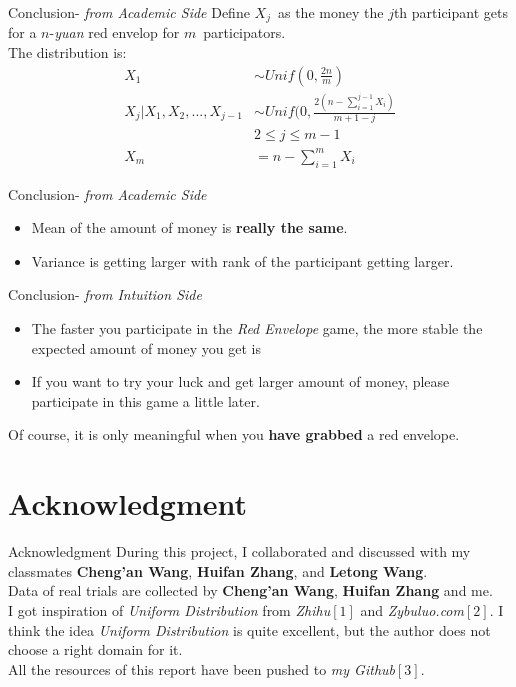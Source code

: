 \documentclass[12pt]{beamer}
\begin{document}
\begin{frame}{Conclusion- \emph{from Academic Side}}
	Define \(X_j\)\ as the money the \(j\)th participant gets for a \(n\)-\emph{yuan} red envelop for \(m\)\ participators.
	\\
	The distribution is:
	\[
		\begin{split}
			X_1&\sim Unif(0,\frac{2n}{m})
			\\
			X_j|X_1,X_2,...,X_{j-1}&\sim Unif(0,\frac{2(n-\sum_{i=1}^{j-1}X_i)}{m+1-j}
			\\
			&2\leq j\leq m-1
			\\
			X_m&=n-\sum_{i=1}^{m}X_i
		\end{split}
	\] 
\end{frame}

\begin{frame}{Conclusion- \emph{from Academic Side}}
	\begin{itemize}
		\item Mean of the amount of money is \textbf{really the same}.
		\item Variance is getting larger with rank of the participant getting larger.
	\end{itemize}
\end{frame}

\begin{frame}{Conclusion- \emph{from Intuition Side}}
	\begin{itemize}
		\item The faster you participate in the \emph{Red Envelope} game, the more stable the expected amount of money you get is
		\item If you want to try your luck and get larger amount of money, please participate in this game a little later.
	\end{itemize}
	Of course, it is only meaningful when you \textbf{have grabbed} a red envelope.
\end{frame}

\section{Acknowledgment}

\begin{frame}{Acknowledgment}
	During this project, I collaborated and discussed with my classmates \textbf{Cheng'an Wang}, \textbf{Huifan Zhang}, and \textbf{Letong Wang}.
	\\
	Data of real trials are collected by \textbf{Cheng'an Wang}, \textbf{Huifan Zhang} and me.
	\\
	I got inspiration of \emph{Uniform Distribution} from \emph{Zhihu}\(\left[ 1 \right]\) and \emph{Zybuluo.com}\(\left[ 2 \right]\). I think the idea \emph{Uniform Distribution} is quite excellent, but the author does not choose a right domain for it.
	\\
	All the resources of this report have been pushed to \emph{my Github}\(\left[ 3 \right]\).
\end{frame}
\end{document}

